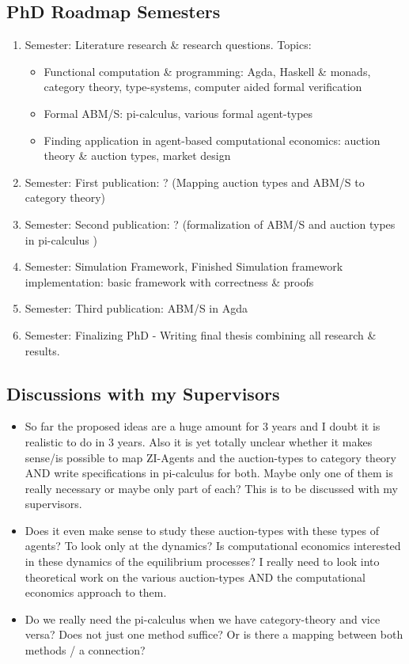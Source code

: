 \subsection*{PhD Roadmap Semesters}
\begin{enumerate}
\item Semester: Literature research \& research questions. Topics: 
	\begin{itemize}
	\item Functional computation \& programming: Agda, Haskell \& monads, category theory, type-systems, computer aided formal verification 
	\item Formal ABM/S: pi-calculus, various formal agent-types
	\item Finding application in agent-based computational economics: auction theory \& auction types, market design
	\end{itemize}
\item Semester: First publication: ? (Mapping auction types and ABM/S to category theory)
\item Semester: Second publication: ? (formalization of ABM/S and auction types in pi-calculus )
\item Semester: Simulation Framework, Finished Simulation framework implementation: basic framework with correctness \& proofs 
\item Semester: Third publication: ABM/S in Agda
\item Semester: Finalizing PhD - Writing final thesis combining all research \& results.
\end{enumerate}

\subsection*{Discussions with my Supervisors}
\begin{itemize}
\item So far the proposed ideas are a huge amount for 3 years and I doubt it is realistic to do in 3 years. Also it is yet totally unclear whether it makes sense/is possible to map ZI-Agents and the auction-types to category theory AND write specifications in pi-calculus for both. Maybe only one of them is really necessary or maybe only part of each? This is to be discussed with my supervisors.
\item Does it even make sense to study these auction-types with these types of agents? To look only at the dynamics? Is computational economics interested in these dynamics of the equilibrium processes? I really need to look into theoretical work on the various auction-types AND the computational economics approach to them.
\item Do we really need the pi-calculus when we have category-theory and vice versa? Does not just one method suffice? Or is there a mapping between both methods / a connection?
\end{itemize}

